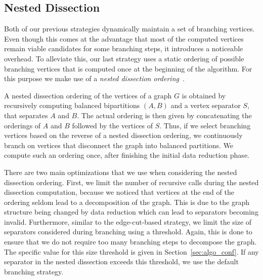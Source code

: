 \documentclass[a4paper,UKenglish,cleveref, autoref, thm-restate]{lipics-v2021}
\begin{document}
\subsection{Nested Dissection}
Both of our previous strategies dynamically maintain a set of branching vertices.
Even though this comes at the advantage that most of the computed vertices remain viable candidates for some branching steps, it introduces a noticeable overhead.
To alleviate this, our last strategy uses a static ordering of possible branching vertices that is computed once at the beginning of the algorithm.
For this purpose we make use of a \emph{nested dissection ordering}~\cite{george1973nested}.

A nested dissection ordering of the vertices of a graph $G$ is obtained by recursively computing balanced bipartitions $(A,B)$ and a vertex separator $S$, that separates $A$ and $B$.
The actual ordering is then given by concatenating the orderings of $A$ and $B$ followed by the vertices of $S$.
Thus, if we select branching vertices based on the reverse of a nested dissection
ordering, we continuously branch on vertices that disconnect the graph into balanced partitions. 
We compute such an ordering once, after finishing the initial data reduction phase.

There are two main optimizations that we use when considering the nested dissection ordering.
First, we limit the number of recursive calls during the nested dissection
computation, because we noticed that vertices at the end of the ordering seldom lead to a decomposition of the graph. 
This is due to the graph structure being changed by data reduction which can lead to separators becoming invalid.
Furthermore, similar to the edge-cut-based strategy, we limit the size of
separators considered during branching using a threshold.
Again, this is done to ensure that we do not require too many branching steps to decompose the graph.
The specific value for this size threshold is given in Section~\ref{sec:algo_conf}.
If any separator in the nested dissection exceeds this threshold, we use the default branching strategy.
\end{document}
